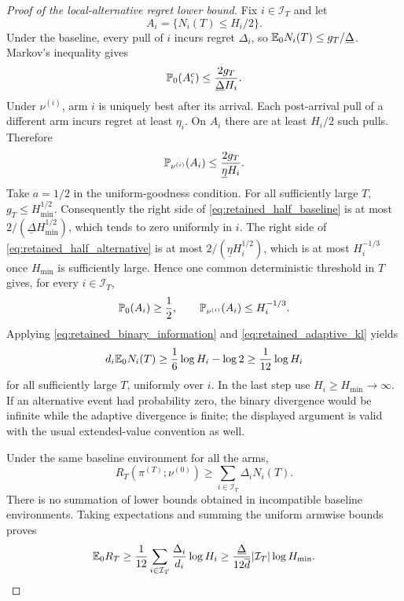 \begin{proof}[Proof of the local-alternative regret lower bound]
Fix $i\in\mathcal I_T$ and let
\[
 A_i=\{N_i(T)\le H_i/2\}.
\]
Under the baseline, every pull of $i$ incurs regret $\Delta_i$, so
$\mathbb E_0N_i(T)\le g_T/\underline\Delta$. Markov's inequality gives
\begin{equation}
 \mathbb P_0(A_i^c)\le\frac{2g_T}{\underline\Delta H_i}.
 \label{eq:retained_half_baseline}
\end{equation}
Under $\nu^{(i)}$, arm $i$ is uniquely best after its arrival. Each
post-arrival pull of a different arm incurs regret at least $\eta_i$.
On $A_i$ there are at least $H_i/2$ such pulls. Therefore
\begin{equation}
 \mathbb P_{\nu^{(i)}}(A_i)
       \le\frac{2g_T}{\underline\eta H_i}.
 \label{eq:retained_half_alternative}
\end{equation}
Take $a=1/2$ in the uniform-goodness condition. For all sufficiently
large $T$, $g_T\le H_{\min}^{1/2}$. Consequently the right side of
\eqref{eq:retained_half_baseline} is at most
$2/(\underline\Delta H_{\min}^{1/2})$, which tends to zero uniformly in
$i$. The right side of \eqref{eq:retained_half_alternative} is at most
$2/(\underline\eta H_i^{1/2})$, which is at most $H_i^{-1/3}$ once
$H_{\min}$ is sufficiently large. Hence one common deterministic
threshold in $T$ gives, for every $i\in\mathcal I_T$,
\[
 \mathbb P_0(A_i)\ge\frac12,\qquad
 \mathbb P_{\nu^{(i)}}(A_i)\le H_i^{-1/3}.
\]
Applying \eqref{eq:retained_binary_information} and
\eqref{eq:retained_adaptive_kl} yields
\[
 d_i\mathbb E_0N_i(T)
       \ge\frac16\log H_i-\log2
       \ge\frac1{12}\log H_i
\]
for all sufficiently large $T$, uniformly over $i$. In the last step
use $H_i\ge H_{\min}\to\infty$. If an alternative event had probability
zero, the binary divergence would be infinite while the adaptive
divergence is finite; the displayed argument is valid with the usual
extended-value convention as well.

Under the same baseline environment for all the arms,
\[
 R_T(\pi^{(T)};\nu^{(0)})
       \ge\sum_{i\in\mathcal I_T}\Delta_iN_i(T).
\]
There is no summation of lower bounds obtained in incompatible baseline
environments. Taking expectations and summing the uniform armwise
bounds proves
\[
 \mathbb E_0R_T
       \ge\frac1{12}\sum_{i\in\mathcal I_T}
                  \frac{\Delta_i}{d_i}\log H_i
       \ge\frac{\underline\Delta}{12\overline d}
                 |\mathcal I_T|\log H_{\min}.
\]
\end{proof}

